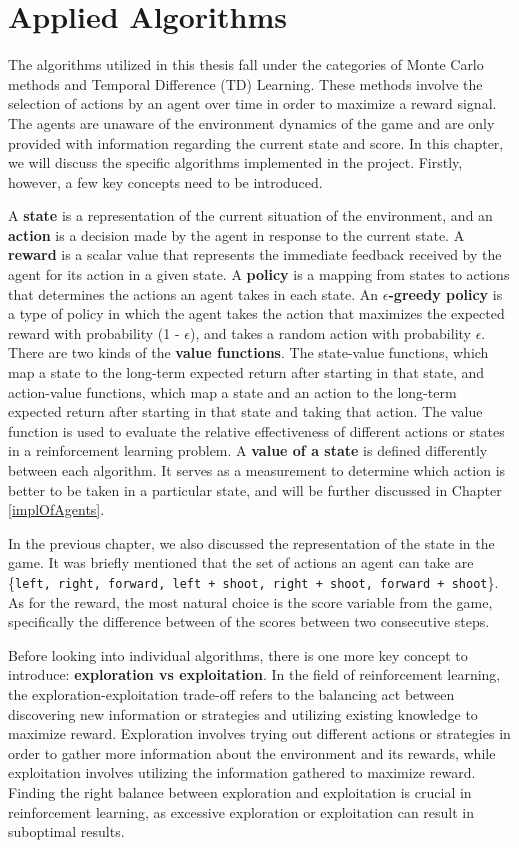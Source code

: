 \chapter{Applied Algorithms}
The algorithms utilized in this thesis fall under the categories of Monte Carlo methods and Temporal Difference (TD) Learning. These methods involve the selection of actions by an agent over time in order to maximize a reward signal. The agents are unaware of the environment dynamics of the game and are only provided with information regarding the current state and score. In this chapter, we will discuss the specific algorithms implemented in the project. Firstly, however, a few key concepts need to be introduced.

A \textbf{state} is a representation of the current situation of the environment, and an \textbf{action} is a decision made by the agent in response to the current state. A \textbf{reward} is a scalar value that represents the immediate feedback received by the agent for its action in a given state. A \textbf{policy} is a mapping from states to actions that determines the actions an agent takes in each state. An \textbf{$\epsilon$-greedy policy} is a type of policy in which the agent takes the action that maximizes the expected reward with probability (1 - $\epsilon$), and takes a random action with probability $\epsilon$. There are two kinds of the \textbf{value functions}. The state-value functions, which map a state to the long-term expected return after starting in that state, and action-value functions, which map a state and an action to the long-term expected return after starting in that state and taking that action. The value function is used to evaluate the relative effectiveness of different actions or states in a reinforcement learning problem. A \textbf{value of a state} is defined differently between each algorithm. It serves as a measurement to determine which action is better to be taken in a particular state, and will be further discussed in Chapter \ref{implOfAgents}.  

In the previous chapter, we also discussed the representation of the state in the game. It was briefly mentioned that the set of actions an agent can take are \{\texttt{left, right, forward, left + shoot, right + shoot, forward + shoot}\}.\\ As for the reward, the most natural choice is the score variable from the game, specifically the difference between of the scores between two consecutive steps.

Before looking into individual algorithms, there is one more key concept to introduce: \textbf{exploration vs exploitation}. In the field of reinforcement learning, the exploration-exploitation trade-off refers to the balancing act between discovering new information or strategies and utilizing existing knowledge to maximize reward. Exploration involves trying out different actions or strategies in order to gather more information about the environment and its rewards, while exploitation involves utilizing the information gathered to maximize reward. Finding the right balance between exploration and exploitation is crucial in reinforcement learning, as excessive exploration or exploitation can result in suboptimal results.



